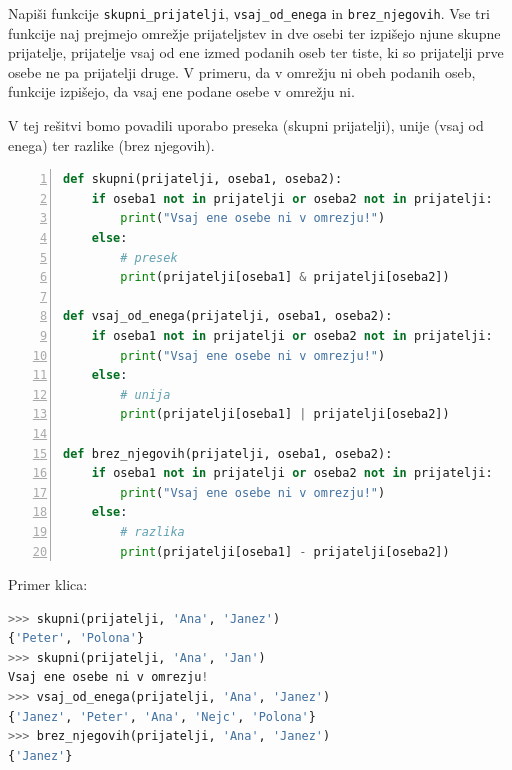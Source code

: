\begin{zgled}
Napiši funkcije \texttt{skupni\_prijatelji}, \texttt{vsaj\_od\_enega} in \texttt{brez\_njegovih}. Vse tri funkcije naj prejmejo omrežje prijateljstev in dve osebi ter izpišejo njune skupne prijatelje, prijatelje vsaj od ene izmed podanih oseb ter tiste, ki so prijatelji prve osebe ne pa prijatelji druge. V primeru, da v omrežju ni obeh podanih oseb, funkcije izpišejo, da vsaj ene podane osebe v omrežju ni.
\end{zgled}
\begin{resitev}
V tej rešitvi bomo povadili uporabo preseka (skupni prijatelji), unije (vsaj od enega) ter razlike (brez njegovih). 
\begin{lstlisting}[language=Python,numbers=left]
def skupni(prijatelji, oseba1, oseba2):
    if oseba1 not in prijatelji or oseba2 not in prijatelji:
        print("Vsaj ene osebe ni v omrezju!")
    else:
        # presek
        print(prijatelji[oseba1] & prijatelji[oseba2])

def vsaj_od_enega(prijatelji, oseba1, oseba2):
    if oseba1 not in prijatelji or oseba2 not in prijatelji:
        print("Vsaj ene osebe ni v omrezju!")
    else:
        # unija
        print(prijatelji[oseba1] | prijatelji[oseba2])

def brez_njegovih(prijatelji, oseba1, oseba2):
    if oseba1 not in prijatelji or oseba2 not in prijatelji:
        print("Vsaj ene osebe ni v omrezju!")
    else:
        # razlika
        print(prijatelji[oseba1] - prijatelji[oseba2])
\end{lstlisting}
Primer klica:
\begin{lstlisting}[language=Python]
>>> skupni(prijatelji, 'Ana', 'Janez')
{'Peter', 'Polona'}
>>> skupni(prijatelji, 'Ana', 'Jan')
Vsaj ene osebe ni v omrezju!
>>> vsaj_od_enega(prijatelji, 'Ana', 'Janez')
{'Janez', 'Peter', 'Ana', 'Nejc', 'Polona'}
>>> brez_njegovih(prijatelji, 'Ana', 'Janez')
{'Janez'}
\end{lstlisting}
\end{resitev}


